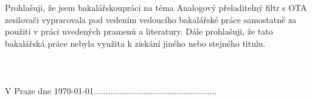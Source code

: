 \vspace{18cm}

Prohlašuji, že jsem bakalářskoupráci na téma Analogový  přeladitelný filtr s OTA zesilovači vypracovala  pod vedením vedoucího bakalářské práce samostatně za použití v práci uvedených pramenů a literatury. Dále  prohlašuji, že tato bakalářská práce nebyla využita k získání jiného nebo stejného titulu.\\
\\
\\
\\
V Praze dne \today \hfill \hfill ....................................................
